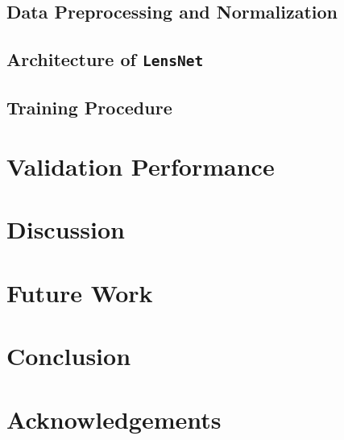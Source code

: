 \documentclass[trackchanges,twocolumn]{aastex7}
\begin{document}
\subsection{Data Preprocessing and Normalization}
\subsection{Architecture of {\tt\string LensNet}}
\subsection{Training Procedure}


\section{Validation Performance} \label{sec:validation-performance}


\section{Discussion} \label{sec:discussion}


\section{Future Work} \label{sec:future-work}


\section{Conclusion} \label{sec:conclusion}


\section{Acknowledgements} \label{sec:acknowledgement}


{}



\end{document}
